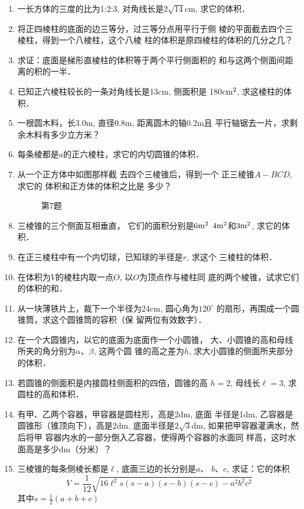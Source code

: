 
\begin{enumerate}
    \item 一长方体的三度的比为1:2:3, 对角线长是$2\sqrt{14}$cm, 求它的体积．
    \item 将正四棱柱的底面的边三等分，过三等分点用平行于侧
    棱的平面截去四个三棱柱，得到一个八棱柱，这个八棱
    柱的体积是原四棱柱的体积的几分之几？
    \item 求证：底面是梯形直棱柱的体积等于两个平行侧面积的
    和与这两个侧面间距离的积的一半．
    \item 已知正六棱柱较长的一条对角线长是13cm, 侧面积是
    180${\rm cm^2}$, 求这棱柱的体积．
    \item 一根圆木料，长3.0m, 直径0.8m, 距离圆木的轴0.2m且
    平行轴锯去一片，求剩余木料有多少立方米？
    \item 每条棱都是$a$的正六棱柱，求它的内切圆锥的体积．
    \item 从一个正方体中如图那样截
    去四个三棱锥后，得到一个
    正三棱锥$A-BCD$, 求它的
    体积和正方体的体积之比是
    多少？

\begin{figure}[htp]
    \centering
    \caption*{第7题}
\end{figure}

    \item 三棱锥的三个侧面互相垂直，
    它们的面积分别是$6{\rm m^2}$
    $4{\rm m^2}$和$3{\rm m^2}$, 求它的体积．
    \item 在正三棱柱中有一个内切球，已知球的半径是$r$, 求这个
    三棱柱的体积．
    \item 在体积为$V$的棱柱内取一点$O$, 以$O$为顶点作与棱柱同
    底的两个棱锥，试求它们的体积的和．
    \item 从一块薄铁片上，裁下一个半径为24cm, 圆心角为$120^{\circ}$
    的扇形，再围成一个圆锥筒，求这个圆锥筒的容积（保
    留两位有效数字）．
    \item 在一个大圆锥内，以它的底面为底面作一个小圆锥，
    大、小圆锥的高和母线所夹的角分别为$\alpha$、$\beta$, 这两个圆
    锥的高之差为$h$, 求大小圆锥的侧面所夹部分的体积．
    \item 若圆锥的侧面积是内接圆柱侧面积的四倍，圆锥的高
    $h=2$, 母线长$\ell =3$, 求圆柱的高和体积．
    \item 有甲、乙两个容器，甲容器是圆柱形，高是2dm, 底面
    半径是1dm, 乙容器是圆锥形（锥顶向下），高是2dm.
    底面半径是$2\sqrt{3}$dm, 如果把甲容器灌满水，然后将甲
    容器内水的一部分倒入乙容器，使得两个容器的水面同
    样高，这时水面高是多少dm（分米）？
\item 三棱锥的每条侧棱长都是$\ell$, 底面三边的长分别是$a$、
$b$、$c$, 求证：它的体积
\[V=\frac{1}{12}\sqrt{16\ell^2 s(s-a)(s-b)(s-c)-a^2b^2c^2}\]
其中$s=\frac{1}{2}(a+b+c)$


\end{enumerate}

